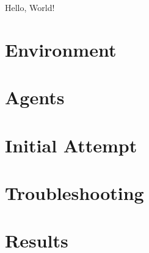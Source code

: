 \documentclass[11pt]{article}
\begin{document}
    Hello, World!


    \section{Environment}\label{sec:environment}
    


    \section{Agents}\label{sec:agents}
    


    \section{Initial Attempt}\label{sec:initital_attempt}
    


    \section{Troubleshooting}\label{sec:troubleshooting}
    


    \section{Results}\label{sec:results}
    
\end{document}
